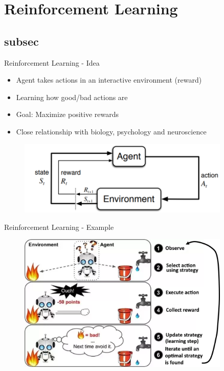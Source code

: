 \section{Reinforcement Learning}
\subsection{subsec} %

\begin{frame}[c]{Reinforcement Learning - Idea}
\begin{itemize}
	\item Agent takes actions in an interactive environment (reward)
	\item Learning how good/bad actions are
	\item Goal: Maximize positive rewards
	\item Close relationship with biology, psychology and neuroscience
\end{itemize}
\begin{figure}[ht]
	\centering
	\includegraphics[width=0.9\textwidth]{img-elias/reinforcement_learning.png}
\end{figure}
\end{frame}

\begin{frame}[c]{Reinforcement Learning - Example}
\begin{figure}[ht]
	\centering
	\includegraphics[width=0.9\textwidth]{img-elias/example.png}
\end{figure}
\end{frame}

